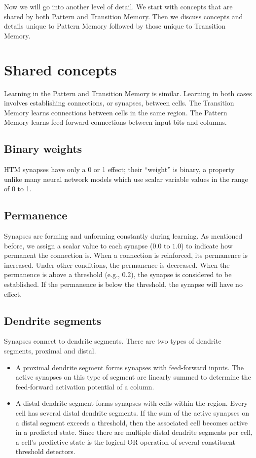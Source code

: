 Now we will go into another level of detail. We start with concepts
that are shared by both Pattern and Transition Memory. Then we
discuss concepts and details unique to Pattern Memory followed by
those unique to Transition Memory.

\section*{Shared concepts}

Learning in the Pattern and Transition Memory is
similar. Learning in both cases involves establishing connections, or
synapses, between cells. The Transition Memory learns connections
between cells in the same region. The Pattern Memory learns
feed-forward connections between input bits and columns.

\subsection*{Binary weights}
HTM synapses have only a 0 or 1 effect; their ``weight'' is binary, a
property unlike many neural network models which use scalar variable
values in the range of 0 to 1.

\subsection*{Permanence}
Synapses are forming and unforming constantly during learning. As
mentioned before, we assign a scalar value to each synapse ($0.0$ to
$1.0$) to indicate how permanent the connection is. When a connection is
reinforced, its permanence is increased. Under other conditions, the
permanence is decreased. When the permanence is above a threshold
(e.g., $0.2$), the synapse is considered to be established. If the
permanence is below the threshold, the synapse will have no effect.

\subsection*{Dendrite segments}
Synapses connect to dendrite segments. There are two types of dendrite
segments, proximal and distal.
\begin{itemize}
\item A proximal dendrite segment forms synapses with feed-forward
  inputs. The active synapses on this type of segment are linearly
  summed to determine the feed-forward activation potential of a column.

\item A distal dendrite segment forms synapses with cells within the
  region. Every cell has several distal dendrite segments. If the sum
  of the active synapses on a distal segment exceeds a threshold, then
  the associated cell becomes active in a predicted state. Since there
  are multiple distal dendrite segments per cell, a cell's predictive
  state is the logical OR operation of several constituent threshold
  detectors.
\end{itemize}

